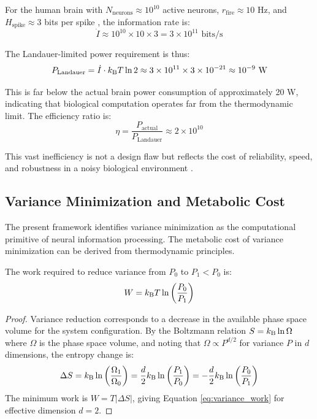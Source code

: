 For the human brain with $N_{\text{neurons}} \approx 10^{10}$ active neurons, $r_{\text{fire}} \approx 10$ Hz, and $H_{\text{spike}} \approx 3$ bits per spike \citep{rieke1999spikes}, the information rate is:
\begin{equation}
\dot{I} \approx 10^{10} \times 10 \times 3 = 3 \times 10^{11} \text{ bits/s}
\end{equation}

The Landauer-limited power requirement is thus:
\begin{equation}
P_{\text{Landauer}} = \dot{I} \cdot k_{\mathrm{B}} T \ln 2 \approx 3 \times 10^{11} \times 3 \times 10^{-21} \approx 10^{-9} \text{ W}
\label{eq:landauer_power}
\end{equation}

This is far below the actual brain power consumption of approximately 20 W, indicating that biological computation operates far from the thermodynamic limit. The efficiency ratio is:
\begin{equation}
\eta = \frac{P_{\text{actual}}}{P_{\text{Landauer}}} \approx 2 \times 10^{10}
\end{equation}

This vast inefficiency is not a design flaw but reflects the cost of reliability, speed, and robustness in a noisy biological environment \citep{laughlin2001energy,attwell2001energy}.

\subsection{Variance Minimization and Metabolic Cost}

The present framework identifies variance minimization as the computational primitive of neural information processing. The metabolic cost of variance minimization can be derived from thermodynamic principles.

\begin{definition}
\label{def:variance_work}
The work required to reduce variance from $P_0$ to $P_1 < P_0$ is:
\begin{equation}
W = k_{\mathrm{B}} T \ln\left(\frac{P_0}{P_1}\right)
\label{eq:variance_work}
\end{equation}
\end{definition}

\begin{proof}
Variance reduction corresponds to a decrease in the available phase space volume for the system configuration. By the Boltzmann relation $S = k_{\mathrm{B}} \ln \Omega$ where $\Omega$ is the phase space volume, and noting that $\Omega \propto P^{d/2}$ for variance $P$ in $d$ dimensions, the entropy change is:
\begin{equation}
\Delta S = k_{\mathrm{B}} \ln\left(\frac{\Omega_1}{\Omega_0}\right) = \frac{d}{2} k_{\mathrm{B}} \ln\left(\frac{P_1}{P_0}\right) = -\frac{d}{2} k_{\mathrm{B}} \ln\left(\frac{P_0}{P_1}\right)
\end{equation}
The minimum work is $W = T |\Delta S|$, giving Equation \ref{eq:variance_work} for effective dimension $d = 2$.
\end{proof}


